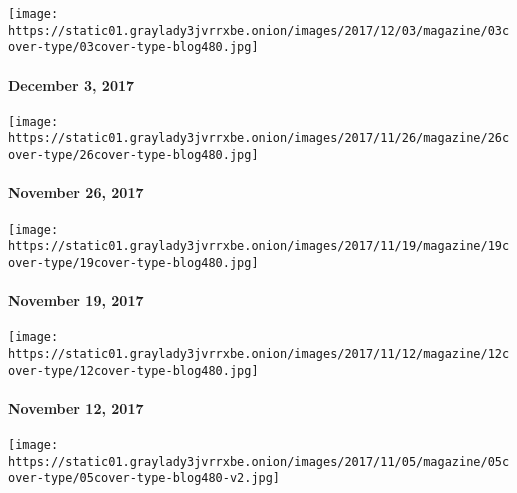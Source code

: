 \href{https://www.nytimes3xbfgragh.onion/issue/magazine/2017/12/01/120317-issue}{}

\texttt{[image: https://static01.graylady3jvrrxbe.onion/images/2017/12/03/magazine/03cover-type/03cover-type-blog480.jpg]}

\hypertarget{december-3-2017}{%
\paragraph{December 3, 2017}\label{december-3-2017}}

\href{https://www.nytimes3xbfgragh.onion/issue/magazine/2017/11/27/112617-issue}{}

\texttt{[image: https://static01.graylady3jvrrxbe.onion/images/2017/11/26/magazine/26cover-type/26cover-type-blog480.jpg]}

\hypertarget{november-26-2017}{%
\paragraph{November 26, 2017}\label{november-26-2017}}

\href{https://www.nytimes3xbfgragh.onion/issue/magazine/2017/11/17/111917-issue}{}

\texttt{[image: https://static01.graylady3jvrrxbe.onion/images/2017/11/19/magazine/19cover-type/19cover-type-blog480.jpg]}

\hypertarget{november-19-2017}{%
\paragraph{November 19, 2017}\label{november-19-2017}}

\href{https://www.nytimes3xbfgragh.onion/interactive/2017/11/07/magazine/tech-design-future-autonomous-cars-american-interstate-highway-roads-suburbs.html}{}

\texttt{[image: https://static01.graylady3jvrrxbe.onion/images/2017/11/12/magazine/12cover-type/12cover-type-blog480.jpg]}

\hypertarget{november-12-2017}{%
\paragraph{November 12, 2017}\label{november-12-2017}}

\href{https://www.nytimes3xbfgragh.onion/issue/magazine/2017/11/03/110517-issue}{}

\texttt{[image: https://static01.graylady3jvrrxbe.onion/images/2017/11/05/magazine/05cover-type/05cover-type-blog480-v2.jpg]}

